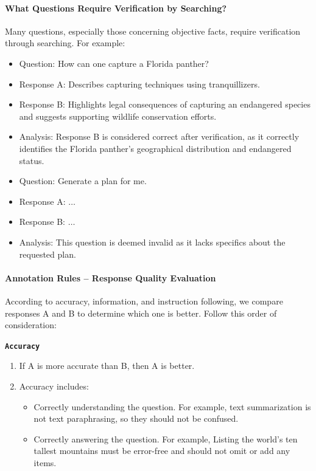\documentclass[11pt]{article}
\theoremstyle{plain}
\theoremstyle{definition}
\theoremstyle{remark}
\begin{document}
\paragraph{What Questions Require Verification by Searching?}
Many questions, especially those concerning objective facts, require verification through searching. For example:

\begin{itemize}[left=0cm]
\item Question: How can one capture a Florida panther?
\item Response A: Describes capturing techniques using tranquillizers.
\item Response B: Highlights legal consequences of capturing an endangered species and suggests supporting wildlife conservation efforts.
\item Analysis: Response B is considered correct after verification, as it correctly identifies the Florida panther's geographical distribution and endangered status.
\end{itemize}

\begin{itemize}[left=0cm]
\item Question: Generate a plan for me.
\item Response A: $\ldots$
\item Response B: $\ldots$
\item Analysis: This question is deemed invalid as it lacks specifics about the requested plan.
\end{itemize}

\paragraph{Annotation Rules -- Response Quality Evaluation}
According to accuracy, information, and instruction following, we compare responses A and B to determine which one is better. Follow this order of consideration:

\textbf{\texttt{Accuracy}}
\begin{enumerate}[left=0cm]
    \item If A is more accurate than B, then A is better.
    \item Accuracy includes:
    \begin{itemize}
        \item Correctly understanding the question. For example, text summarization is not text paraphrasing, so they should not be confused.
        \item Correctly answering the question. For example, Listing the world's ten tallest mountains must be error-free and should not omit or add any items.
    \end{itemize}
\end{enumerate}
\end{document}
